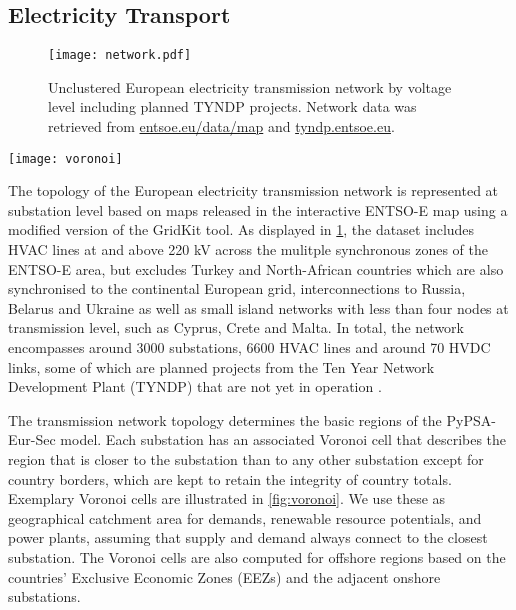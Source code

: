 \subsection{Electricity Transport}
\label{sec:si:electricity:transport}

\begin{figure}
    \texttt{[image: network.pdf]}
    \caption{Unclustered European electricity transmission network by voltage level including planned TYNDP projects. Network data was retrieved from \href{https://www.entsoe.eu/data/map/}{entsoe.eu/data/map} and \href{https://tyndp.entsoe.eu/}{tyndp.entsoe.eu}.}
    \label{fig:base-network}
\end{figure}

\begin{SCfigure}
    \caption{Exemplary Voronoi cells of the transmission network's substations.}
    \texttt{[image: voronoi]}
    \label{fig:voronoi}
\end{SCfigure}


The topology of the European electricity transmission network is represented at
substation level based on maps released in the interactive \mbox{ENTSO-E} map 
using a modified version of the GridKit  tool. As displayed in
\cref{fig:base-network}, the dataset includes HVAC lines at and above 220 kV
across the mulitple synchronous zones of the \mbox{ENTSO-E} area, but excludes Turkey
and North-African countries which are also synchronised to the continental
European grid, interconnections to Russia, Belarus and Ukraine as well as small
island networks with less than four nodes at transmission level, such as Cyprus,
Crete and Malta. In total, the network encompasses around 3000 substations, 6600
HVAC lines and around 70 HVDC links, some of which are planned projects from the
Ten Year Network Development Plant (TYNDP) that are not yet in operation
.


The transmission network topology determines the basic regions of the
PyPSA-Eur-Sec model. Each substation has an associated Voronoi cell that
describes the region that is closer to the substation than to any other
substation except for country borders, which are kept to retain the integrity of
country totals. Exemplary Voronoi cells are illustrated in \cref{fig:voronoi}.
We use these as geographical catchment area for demands, renewable resource
potentials, and power plants, assuming that supply and demand always connect to
the closest substation. The Voronoi cells are also computed for offshore regions
based on the countries' Exclusive Economic Zones (EEZs) and the adjacent onshore
substations.

